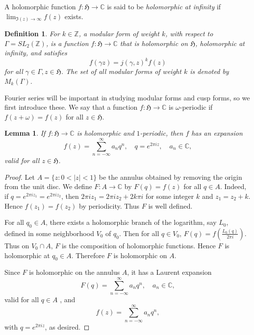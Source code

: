 \documentclass{article}
\newtheorem{lemma}[theorem]{Lemma}
\newtheorem{definition}[theorem]{Definition}
\begin{document}
A holomorphic function $f:\mathfrak{H} \to \mathbb{C}$ is said to be {\em holomorphic at infinity} if
$\lim_{\Im(z) \to \infty} f(z)$ exists.

\begin{definition}
For $k \in \mathbb{Z}$,
a {\em modular form of weight $k$}, with respect to $\Gamma=SL_2(\mathbb{Z})$, is a function $f:\mathfrak{H} \to \mathbb{C}$
that is holomorphic on $\mathfrak{H}$, holomorphic at infinity, and satisfies
\[
f(\gamma z)=j(\gamma,z)^k f(z)
\]
for all
$\gamma \in \Gamma, z \in \mathfrak{H}$.
The set of all modular forms of weight $k$ is denoted by $M_k(\Gamma)$.
\end{definition}


Fourier series will be important in studying modular forms and cusp forms, so we first introduce these.
We say that a function $f:\mathfrak{H} \to \mathbb{C}$ is $\omega$-periodic if $f(z+\omega)=f(z)$ for all $z \in \mathfrak{H}$.

\begin{lemma}
\label{lemma:fourier}
If $f:\mathfrak{H} \to \mathbb{C}$ is holomorphic and $1$-periodic, then
$f$ has an expansion
\begin{equation}
\label{eqn:fourier}
f(z)=\sum_{n=-\infty}^\infty a_n q^n, \quad q=e^{2\pi iz}, \quad a_n \in \mathbb{C},
\end{equation}
valid for all $z \in \mathfrak{H}$.
\end{lemma}
\begin{proof}
Let $A=\{z:0<|z|<1\}$ be the annulus obtained by removing the origin from the unit disc. We define $F:A \to \mathbb{C}$ by $F(q)=f(z)$ for all $q \in A$. Indeed, if $q=e^{2\pi iz_1}=e^{2\pi iz_2}$, then $2\pi iz_1=2\pi iz_2+2k\pi i$ for some integer $k$ and
$z_1=z_2+k$. Hence
$f(z_1)=f(z_2)$ by periodicity. Thus $F$ is well defined.

For all $q_0 \in A$, there exists a holomorphic branch of the logarithm, say $L_0$, defined in some neighborhood $V_0$ of $q_0$.
Then for all $q \in V_0$, $F(q)=f(\frac{L_0(q)}{2\pi i})$. 
Thus on $V_0 \cap A$, $F$ is the composition of holomorphic functions. Hence $F$ is holomorphic at $q_0 \in A$. Therefore $F$ is holomorphic on $A$.

Since $F$ is holomorphic on the annulus $A$, it has a Laurent expansion 
\begin{equation}
\label{eqn:laurentseries}
F(q)=\sum_{n=-\infty}^\infty a_n q^n, \quad a_n \in \mathbb{C},
\end{equation}
valid for all $q \in A$ \cite[Chapter V, Theorem 2.1]{MR1659317}, and
\[
f(z)=\sum_{n=-\infty}^\infty a_n q^n, 
\]
with $q=e^{2\pi iz}$, as desired.
\end{proof}
\end{document}
